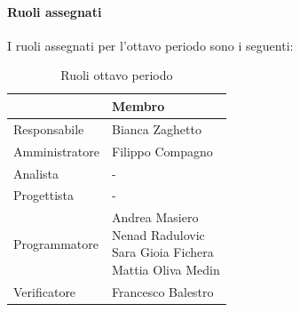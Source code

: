 \documentclass[a4paper,12pt]{article}
\begin{document}
            \paragraph{Ruoli assegnati}
            I ruoli assegnati per l'ottavo periodo sono i seguenti:
                \begin{table}[H]
                \centering
                \caption{Ruoli ottavo periodo}
                \begin{tabular}{|l|l|}
                \hline
                    \rowcolor{lightgray}{\textbf{Ruolo}} & {\textbf{Membro}} \\
                \hline
                    Responsabile & Bianca Zaghetto  \\
                \hline
                    Amministratore & Filippo Compagno  \\
                \hline
                    Analista & - \\
                \hline
                    Progettista & - \\
                \hline
                    Programmatore & \makecell[l]{ Andrea Masiero \\ Nenad Radulovic \\ Sara Gioia Fichera \\ Mattia Oliva Medin} \\
                \hline
                    Verificatore & Francesco Balestro \\
                \hline
                \end{tabular}
                \end{table}
                
\end{document}
